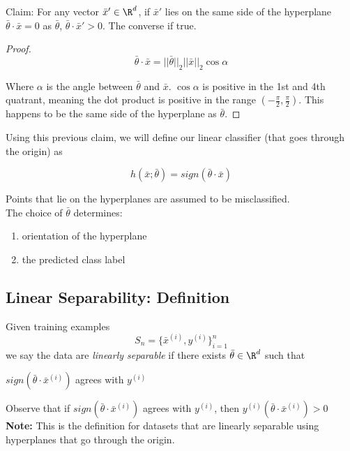 \documentclass[12pt]{article}
\begin{document}
Claim: For any vector $\bar{x}' \in \R^d$, if $\bar{x}'$ lies on the same side of the hyperplane $\bar{\theta} \cdot \bar{x} = 0$ as $\bar{\theta}$, $\bar{\theta} \cdot \bar{x}' > 0$. The converse if true.

\begin{proof}~\\
	\[ \bar{\theta} \cdot \bar{x} = ||\bar{\theta}||_2 ||\bar{x}||_2 \cos \alpha\]
	
	Where $\alpha$ is the angle between $\bar{\theta}$ and $\bar{x}$. $\cos \alpha$ is positive in the 1st and 4th quatrant, meaning the dot product is positive in the range $(-\frac {\pi} 2, \frac {\pi} 2)$. This happens to be the same side of the hyperplane as $\bar{\theta}$.
\end{proof}

Using this previous claim, we will define our linear classifier (that goes through the origin) as 

\[ h(\bar{x};\bar{\theta}) = sign(\bar{\theta} \cdot \bar{x}) \]

Points that lie on the hyperplanes are assumed to be misclassified.\\

The choice of $\bar{\theta}$ determines:
\begin{enumerate}
	\item orientation of the hyperplane
	\item the predicted class label
\end{enumerate}

\subsection{Linear Separability: Definition}

Given training examples 
\[ S_n = \{ \bar{x}^{(i)}, y^{(i)} \}_{i=1}^n \]
we say the data are \emph{linearly separable} if there exists $\bar{\theta} \in \R^d$ such that

\begin{center}
	$sign(\bar{\theta} \cdot \bar{x}^{(i)})$ agrees with $y^{(i)}$
\end{center}

Observe that if $sign(\bar{\theta} \cdot \bar{x}^{(i)})$ agrees with $y^{(i)}$, then $y^{(i)}(\bar{\theta} \cdot \bar{x}^{(i)}) > 0$\\

\textbf{Note:} This is the definition for datasets that are linearly separable using hyperplanes that go through the origin. 
\end{document}
